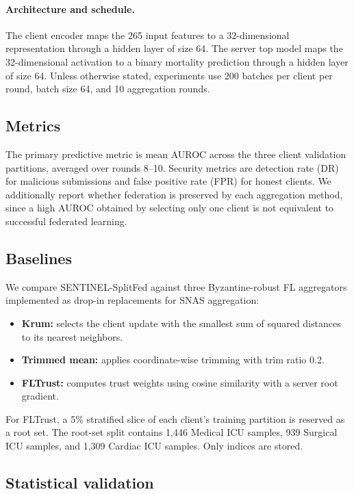 \documentclass[pdflatex,sn-mathphys-num]{sn-jnl}
\begin{document}
\paragraph{Architecture and schedule.} The client encoder maps the 265 input features to a 32-dimensional representation through a hidden layer of size 64. The server top model maps the 32-dimensional activation to a binary mortality prediction through a hidden layer of size 64. Unless otherwise stated, experiments use 200 batches per client per round, batch size 64, and 10 aggregation rounds.

\subsection{Metrics}

The primary predictive metric is mean AUROC across the three client validation partitions, averaged over rounds 8--10. Security metrics are detection rate (DR) for malicious submissions and false positive rate (FPR) for honest clients. We additionally report whether federation is preserved by each aggregation method, since a high AUROC obtained by selecting only one client is not equivalent to successful federated learning.

\subsection{Baselines}

We compare SENTINEL-SplitFed against three Byzantine-robust FL aggregators implemented as drop-in replacements for SNAS aggregation:
\begin{itemize}
    \item \textbf{Krum:} selects the client update with the smallest sum of squared distances to its nearest neighbors.
    \item \textbf{Trimmed mean:} applies coordinate-wise trimming with trim ratio 0.2.
    \item \textbf{FLTrust:} computes trust weights using cosine similarity with a server root gradient.
\end{itemize}
For FLTrust, a 5\% stratified slice of each client's training partition is reserved as a root set. The root-set split contains 1,446 Medical ICU samples, 939 Surgical ICU samples, and 1,309 Cardiac ICU samples. Only indices are stored.

\subsection{Statistical validation}
\end{document}
